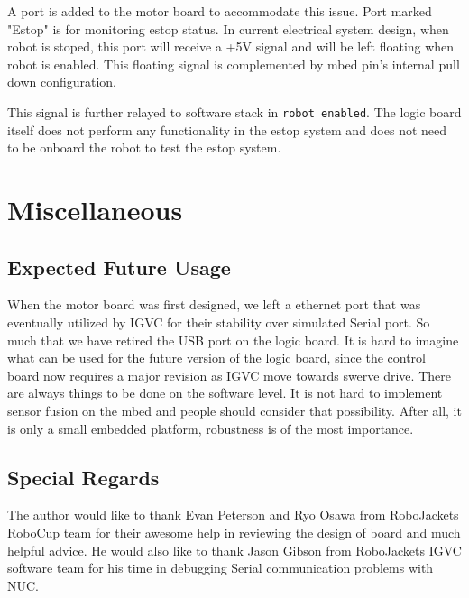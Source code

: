 \documentclass[letterpaper, 12pt]{article}
\begin{document}
A port is added to the motor board to accommodate this issue. Port marked "Estop" is for monitoring
estop status. In current electrical system design, when robot is stoped, this port will receive a +5V
signal and will be left floating when robot is enabled. This floating signal is complemented by mbed
pin's internal pull down configuration. 

This signal is further relayed to software stack in \texttt{robot enabled}. The logic board itself
does not perform any functionality in the estop system and does not need to be onboard the robot to test
the estop system.

\section{Miscellaneous}
\subsection{Expected Future Usage}
When the motor board was first designed, we left a ethernet port that was eventually utilized by IGVC for their
stability over simulated Serial port. So much that we have retired the USB port on the logic board. It is hard to
imagine what can be used for the future version of the logic board, since the control board now requires a major
revision as IGVC move towards swerve drive. There are always things to be done on the software level. It is not
hard to implement sensor fusion on the mbed and people should consider that possibility. After all, it is only
a small  embedded platform, robustness is of the most importance.

\subsection{Special Regards}
The author would like to thank Evan Peterson and Ryo Osawa from RoboJackets RoboCup team for their
awesome help in reviewing the design of board and much helpful advice. He would also like to thank
Jason Gibson from RoboJackets IGVC software team for his time in debugging Serial communication
problems with NUC.  
\end{document}
